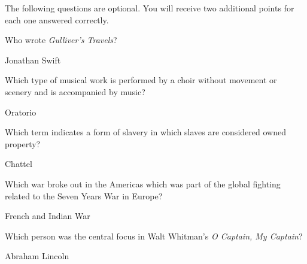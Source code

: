 \documentclass[12pt]{examdesign}
\begin{document}
\pagebreak
\begin{shortanswer}[title={Bonus Section}]
	The following questions are optional. You will receive two additional points for each one answered correctly.

	\begin{question}
		Who wrote \emph{Gulliver's Travels}?
		\examvspace{0.5 in}
		\begin{answer}
			Jonathan Swift
		\end{answer}
	\end{question}

	\begin{question}
		Which type of musical work is performed by a choir without movement or scenery and is accompanied by music?
		\examvspace{0.5 in}
		\begin{answer}
			Oratorio
		\end{answer}
	\end{question}

	\begin{question}
		Which term indicates a form of slavery in which slaves are considered owned property?
		\examvspace{0.5 in}
		\begin{answer}
			Chattel
		\end{answer}
	\end{question}

	\begin{question}
		Which war broke out in the Americas which was part of the global fighting related to the Seven Years War in Europe?
		\examvspace{0.5 in}
		\begin{answer}
			French and Indian War
		\end{answer}
	\end{question}

	\begin{question}
		Which person was the central focus in Walt Whitman's \emph{O Captain, My Captain}?
		\examvspace{0.5 in}
		\begin{answer}
			Abraham Lincoln
		\end{answer}
	\end{question}
\end{shortanswer}
\end{document}

